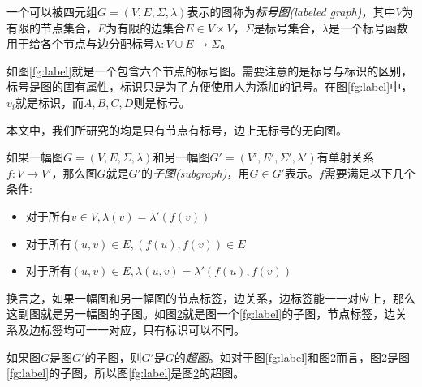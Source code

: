 \documentclass{XDBAthesis}
\begin{document}
\begin{figure}[htp]
\begin{minipage}{0.5\textwidth}
        \label{fg:nn}
    \end{minipage}\hfill
\end{figure}

\begin{defn}[标号图]\cite{ghash}
    一个可以被四元组$G=(V,E,\Sigma,\lambda)$表示的图称为\emph{标号图(labeled graph)}，其中$V$为有限的节点集合，$E$为有限的边集合$E\in V\times V$，$\Sigma$是标号集合，$\lambda$是一个标号函数用于给各个节点与边分配标号$\lambda :V\cup E\rightarrow\Sigma$。
\end{defn}
如图\ref{fg:label}就是一个包含六个节点的标号图。需要注意的是标号与标识的区别，标号是图的固有属性，标识只是为了方便使用人为添加的记号。在图\ref{fg:label}中，$v_i $就是标识，而$A,B,C,D$则是标号。

本文中，我们所研究的均是只有节点有标号，边上无标号的无向图。

\begin{figure}[htp]
    \begin{minipage}{0.5\textwidth}
        \centering
        
        \label{fg:label}
    \end{minipage}%
    \begin{minipage}{0.5\textwidth}
        \centering
        
        \label{fg:sub}
    \end{minipage}\hfill
\end{figure}
\begin{defn}[子图]
    如果一幅图$G=(V,E,\Sigma,\lambda)$和另一幅图$G'=(V',E',\Sigma',\lambda')$有单射关系$f:V\rightarrow V'$，那么图$G$就是$G'$的\emph{子图(subgraph)}，用$G\in G' $表示。$f$需要满足以下几个条件:
\begin{itemize}
    \item 对于所有$v\in V,\lambda(v)=\lambda '(f(v))$
    \item 对于所有$(u,v)\in E,(f(u),f(v))\in E$
    \item 对于所有$(u,v)\in E,\lambda(u,v)=\lambda '(f(u),f(v)) $
\end{itemize}
\end{defn}
换言之，如果一幅图和另一幅图的节点标签，边关系，边标签能一一对应上，那么这副图就是另一幅图的子图。如图\ref{fg:sub}就是图一个\ref{fg:label}的子图，节点标签，边关系及边标签均可一一对应，只有标识可以不同。
\begin{defn}[超图]
    如果图$G$是图$G'$的子图，则$G'$是$G$的\emph{超图}。如对于图\ref{fg:label}和图\ref{fg:sub}而言，图\ref{fg:sub}是图\ref{fg:label}的子图，所以图\ref{fg:label}是图\ref{fg:sub}的超图。
\end{defn}
\end{document}
